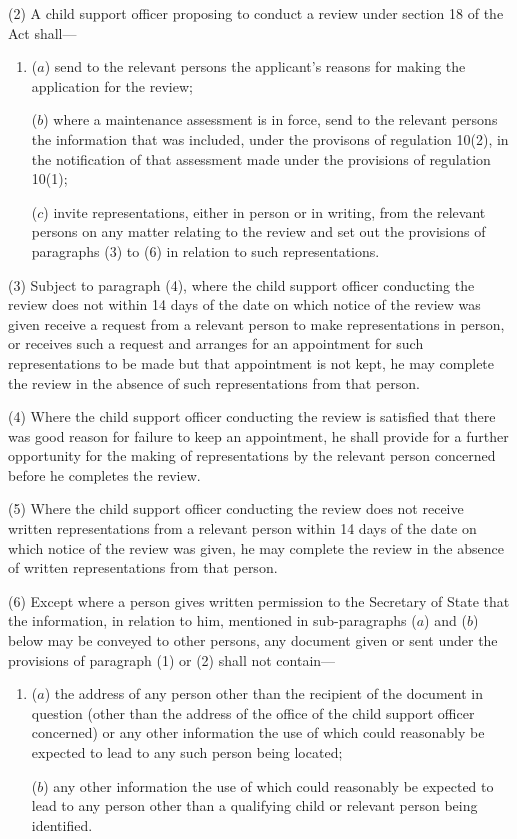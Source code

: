 \documentclass[a4paper]{article}
\begin{document}
(2) A child support officer proposing to conduct a review under section 18 of the Act shall—
\begin{enumerate}\item[]
($a$) send to the relevant persons the applicant’s reasons for making the application for the review;

($b$) where a maintenance assessment is in force, send to the relevant persons the information that was included, under the provisons of regulation 10(2), in the notification of that assessment made under the provisions of regulation 10(1);

($c$) invite representations, either in person or in writing, from the relevant persons on any matter relating to the review and set out the provisions of paragraphs (3) to (6) in relation to such representations.
\end{enumerate}

(3) Subject to paragraph (4), where the child support officer conducting the review does not within 14 days of the date on which notice of the review was given receive a request from a relevant person to make representations in person, or receives such a request and arranges for an appointment for such representations to be made but that appointment is not kept, he may complete the review in the absence of such representations from that person.

(4) Where the child support officer conducting the review is satisfied that there was good reason for failure to keep an appointment, he shall provide for a further opportunity for the making of representations by the relevant person concerned before he completes the review.

(5) Where the child support officer conducting the review does not receive written representations from a relevant person within 14 days of the date on which notice of the review was given, he may complete the review in the absence of written representations from that person.

(6) Except where a person gives written permission to the Secretary of State that the information, in relation to him, mentioned in sub-paragraphs ($a$) and ($b$) below may be conveyed to other persons, any document given or sent under the provisions of paragraph (1) or (2) shall not contain—
\begin{enumerate}\item[]
($a$) the address of any person other than the recipient of the document in question (other than the address of the office of the child support officer concerned) or any other information the use of which could reasonably be expected to lead to any such person being located;

($b$) any other information the use of which could reasonably be expected to lead to any person other than a qualifying child or relevant person being identified.
\end{enumerate}
\end{document}
